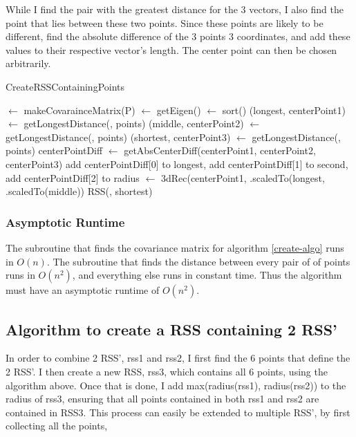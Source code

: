 While I find the pair with the greatest distance for the 3 vectors, I also find the point that lies between these two points. Since these points are likely to be different, find the absolute difference of the 3 points 3 coordinates, and add these values to their respective vector's length. The center point can then be chosen arbitrarily.

\begin{algorithm}[H]
  \caption{CreateRSSContainingPoints}
  \label{create-algo}
   
  \dontprintsemicolon
  \covar $\gets$ makeCovarainceMatrix(P)\;
  \eigen $\gets$ getEigen(\covar) \;
  \eigen $\gets$ sort(\eigen) \;
  (longest, centerPoint1) $\gets$ getLongestDistance(\eigen[2], points) \;
  (middle, centerPoint2) $\gets$ getLongestDistance(\eigen[1], points) \;
  (shortest, centerPoint3) $\gets$ getLongestDistance(\eigen[0], points) \;
  centerPointDiff $\gets$ getAbsCenterDiff(centerPoint1, centerPoint2, centerPoint3) \;
  add centerPointDiff[0] to longest, add centerPointDiff[1] to second, add centerPointDiff[2] to radius \;
  \threedeeRec $\gets$ 3dRec(centerPoint1, \eigen[2].scaledTo(longest, \eigen[1].scaledTo(middle)) \;
  \return RSS(\threedeeRec, shortest) \;
\end{algorithm}

\subsubsection{Asymptotic Runtime}
The subroutine that finds the covariance matrix for algorithm \ref{create-algo} runs in $O(n)$. The subroutine that finds the distance between every pair of of points runs in $O(n^2)$, and everything else runs in constant time. Thus the algorithm must have an asymptotic runtime of $O(n^2)$.

\subsection{Algorithm to create a RSS containing 2 RSS'}
In order to combine  2 RSS', rss1 and rss2, I first find the 6 points that define the 2 RSS'. I then create a new RSS, rss3, which contains all 6 points, using the algorithm above. Once that is done, I add  max(radius(rss1), radius(rss2)) to the radius of rss3, ensuring that all points contained in both rss1 and rss2 are contained in RSS3. This process can easily be extended to multiple RSS', by first collecting all the points, 

